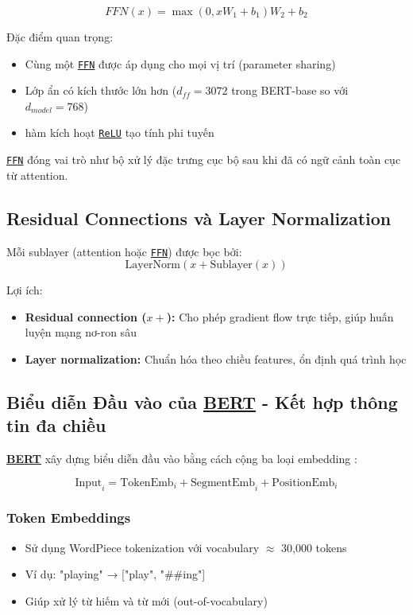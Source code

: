 $$ FFN(x) = \max(0, xW_1 + b_1)W_2 + b_2 $$

Đặc điểm quan trọng:
\begin{itemize}
    \item Cùng một \hyperref[acro:ffn]{\texttt{FFN}} được áp dụng cho mọi vị trí (parameter sharing)
    \item Lớp ẩn có kích thước lớn hơn ($d_{ff}=3072$ trong BERT-base so với $d_{model}=768$)
    \item hàm kích hoạt \hyperref[acro:relu]{\texttt{ReLU}} tạo tính phi tuyến
\end{itemize}

\hyperref[acro:ffn]{\texttt{FFN}} đóng vai trò như bộ xử lý đặc trưng cục bộ sau khi đã có ngữ cảnh toàn cục từ attention.
\subsection{Residual Connections và Layer Normalization}
\label{ssec:residual_layer_norm}
Mỗi sublayer (attention hoặc \hyperref[acro:ffn]{\texttt{FFN}}) được bọc bởi:
$$ \text{LayerNorm}(x + \text{Sublayer}(x)) $$

Lợi ích:
\begin{itemize}
    \item \textbf{Residual connection ($x +$):} Cho phép gradient flow trực tiếp, giúp huấn luyện mạng nơ-ron sâu \cite{vaswani2017attention}
    \item \textbf{Layer normalization:} Chuẩn hóa theo chiều features, ổn định quá trình học \cite{ba2016layer}
\end{itemize}

\subsection{Biểu diễn Đầu vào của \hyperref[acro:bert]{\textbf{BERT}} - Kết hợp thông tin đa chiều}
\label{ssec:input_representation_bert}
\hyperref[acro:bert]{\textbf{BERT}} xây dựng biểu diễn đầu vào bằng cách cộng ba loại embedding \cite{devlin2018bert}:

$$ \text{Input}_i = \text{TokenEmb}_i + \text{SegmentEmb}_i + \text{PositionEmb}_i $$

\subsubsection{Token Embeddings}
\begin{itemize}
    \item Sử dụng WordPiece tokenization với vocabulary $\approx$ 30,000 tokens
    \item Ví dụ: "playing" → ["play", "\#\#ing"]
    \item Giúp xử lý từ hiếm và từ mới (out-of-vocabulary)
\end{itemize}

